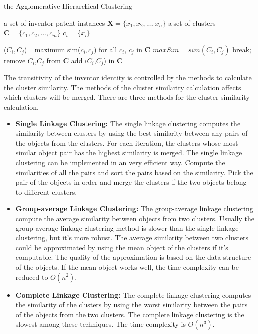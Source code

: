 \begin{algorithm}[b]
\caption{the Agglomerative Hierarchical Clustering}
\begin{algorithmic}
\REQUIRE
	 a set of inventor-patent instances $\textbf{X}=\{x_1,x_2,...,x_n\}$
\ENSURE
	 a set of clusters $\textbf{C}=\{c_1,c_2,...,c_m\}$
          \STATE $c_i=\{ x_i \}$
\ENDFOR	

\STATE  ($C_{i},C_{j}$)= maximum sim($c_i,c_j$) for all $c_i$, $c_j$ in $\textbf{C}$
\STATE  $maxSim=sim(C_{i},C_{j})$ 
\STATE break;
\ENDIF
\STATE remove $C_{i}$,$C_{j}$ from   $\textbf{C}$
\STATE add ({$C_{i}$,$C_{j}$}) in  $\textbf{C}$
\ENDWHILE

  

\end{algorithmic}
\end{algorithm}


The transitivity of the inventor identity is controlled by the methods to calculate the cluster similarity. The methods of the cluster similarity calculation  affects which clusters will be merged.
There are three methods for the cluster similarity calculation. 
\begin{itemize}
\item \textbf{Single Linkage Clustering:}
The single linkage clustering computes the similarity between clusters by using the best similarity between any pairs of the objects from the clusters. For each iteration, the clusters whose most similar object pair has the highest similarity is merged. The single linkage clustering can be implemented in an very efficient way. Compute the similarities of all the pairs and sort the pairs based on the similarity. Pick the pair of the objects in order and merge the clusters if the   two objects belong to different clusters. 
\item \textbf{Group-average Linkage Clustering:}
The group-average linkage clustering compute the average similarity between objects from two clusters. Usually the group-average linkage clustering method is slower than the single linkage clustering, but it's more robust. The average similarity between two clusters could be approximated by using the mean object of the clusters if it's computable. The quality of the approximation is based on the data structure of the objects. If the mean object works well, the time complexity can be reduced to $O(n^2)$.
\item \textbf{Complete Linkage Clustering:}
The complete linkage clustering computes the similarity of the clusters by using the worst similarity between the pairs of the objects from the two clusters. The complete linkage clustering is the slowest among these techniques. The time complexity is $O(n^3)$.
\end{itemize}


